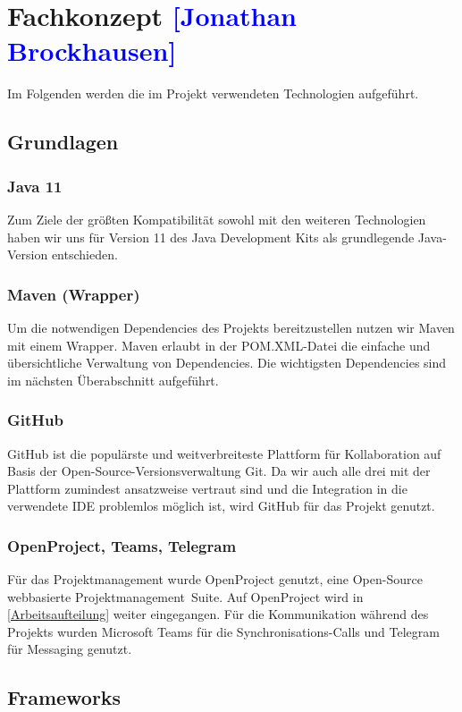 

\section{Fachkonzept \textcolor{blue}{[Jonathan Brockhausen]}}
\label{Technologien}

Im Folgenden werden die im Projekt verwendeten Technologien aufgeführt.

\subsection{Grundlagen}

\subsubsection*{Java 11}
Zum Ziele der größten Kompatibilität sowohl mit den weiteren Technologien haben wir uns für Version 11 des Java Development Kits als grundlegende Java-Version entschieden.
\subsubsection*{Maven (Wrapper)}
Um die notwendigen Dependencies des Projekts bereitzustellen nutzen wir Maven mit einem Wrapper. Maven erlaubt in der POM.XML-Datei die einfache und übersichtliche Verwaltung von Dependencies. Die wichtigsten Dependencies sind im nächsten Überabschnitt aufgeführt.
\subsubsection*{GitHub}
GitHub ist die populärste und weitverbreiteste Plattform für Kollaboration auf Basis der Open-Source-Versionsverwaltung Git. Da wir auch alle drei mit der Plattform zumindest ansatzweise vertraut sind und die Integration in die verwendete IDE problemlos möglich ist, wird GitHub für das Projekt genutzt.
\subsubsection*{OpenProject, Teams, Telegram}
Für das Projektmanagement wurde OpenProject genutzt, eine Open-Source webbasierte Projektmanagement~Suite. Auf OpenProject wird in \autoref{Arbeitsaufteilung} weiter eingegangen.
Für die Kommunikation während des Projekts wurden Microsoft Teams für die Synchronisations-Calls und Telegram für Messaging genutzt.

\subsection{Frameworks}
%

